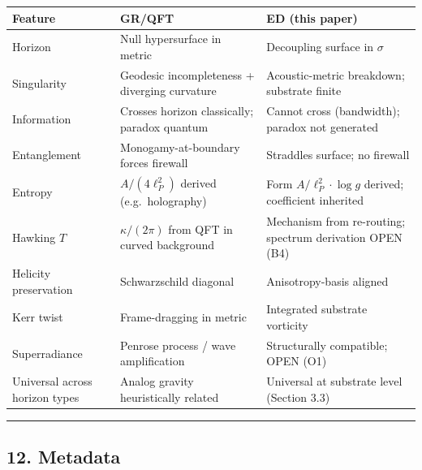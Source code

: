 \documentclass[
  11pt,
  a4paper,
]{article}
\newcounter{none} %
\begin{document}
{\def\LTcaptype{none} %
\begin{longtable}[]{@{}
  >{\raggedright\arraybackslash}p{}
  >{\raggedright\arraybackslash}p{}
  >{\raggedright\arraybackslash}p{}@{}}
\toprule\noalign{}
\begin{minipage}[b]{\linewidth}\raggedright
Feature
\end{minipage} & \begin{minipage}[b]{\linewidth}\raggedright
GR/QFT
\end{minipage} & \begin{minipage}[b]{\linewidth}\raggedright
ED (this paper)
\end{minipage} \\
\midrule\noalign{}
\endhead
\bottomrule\noalign{}
\endlastfoot
Horizon & Null hypersurface in metric & Decoupling surface in
\(\sigma\) \\
Singularity & Geodesic incompleteness + diverging curvature &
Acoustic-metric breakdown; substrate finite \\
Information & Crosses horizon classically; paradox quantum & Cannot
cross (bandwidth); paradox not generated \\
Entanglement & Monogamy-at-boundary forces firewall & Straddles surface;
no firewall \\
Entropy & \(A/(4\ell_P^2)\) derived (e.g.~holography) & Form
\(A/\ell_P^2 \cdot \log g\) derived; coefficient inherited \\
Hawking \(T\) & \(\kappa/(2\pi)\) from QFT in curved background &
Mechanism from re-routing; spectrum derivation OPEN (B4) \\
Helicity preservation & Schwarzschild diagonal & Anisotropy-basis
aligned \\
Kerr twist & Frame-dragging in metric & Integrated substrate
vorticity \\
Superradiance & Penrose process / wave amplification & Structurally
compatible; OPEN (O1) \\
Universal across horizon types & Analog gravity heuristically related &
Universal at substrate level (Section 3.3) \\
\end{longtable}
}

\begin{center}\rule{0.5\linewidth}{0.5pt}\end{center}

\subsection{12. Metadata}\label{metadata}
\end{document}
